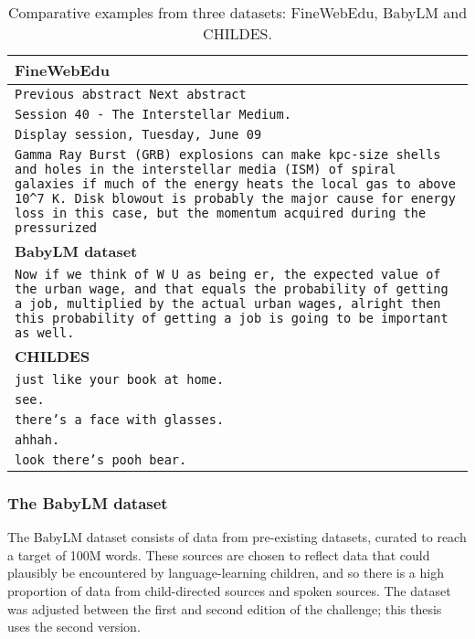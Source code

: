 \begin{table}[t]
    \centering
    \footnotesize
    \begin{tabular}{p{}}
        \toprule
        \textbf{FineWebEdu} \\
        \midrule
        \texttt{Previous abstract Next abstract} \\
        \texttt{Session 40 - The Interstellar Medium.} \\
        \texttt{Display session, Tuesday, June 09} \\
        \texttt{Gamma Ray Burst (GRB) explosions can make kpc-size shells and holes in the interstellar media (ISM) of spiral galaxies if much of the energy heats the local gas to above 10\^{}7 K. Disk blowout is probably the major cause for energy loss in this case, but the momentum acquired during the pressurized} \\
        \midrule
        \textbf{BabyLM dataset} \\
        \midrule
        \texttt{Now if we think of W U as being er, the expected value of the urban wage, and that equals the probability of getting a job, multiplied by the actual urban wages, alright then this probability of getting a job is going to be important as well.} \\
        \midrule
        \textbf{CHILDES} \\
        \midrule
        \texttt{just like your book at home.} \\
        \texttt{see.} \\
        \texttt{there's a face with glasses.} \\
        \texttt{ahhah.} \\
        \texttt{look there's pooh bear.} \\
        \bottomrule   
    \end{tabular}
    \caption{Comparative examples from three datasets: FineWebEdu, BabyLM and CHILDES.}
    \label{tab:12-datasetexamples}
\end{table}



\subsubsection{The BabyLM dataset}\label{sec:12-babylmdataset}

The BabyLM dataset consists of data from pre-existing datasets, curated to reach a target of 100M words. These sources are chosen to reflect data that could plausibly be encountered by language-learning children, and so there is a high proportion of data from child-directed sources and spoken sources. The dataset was adjusted between the first and second edition of the challenge; this thesis uses the second version. 

